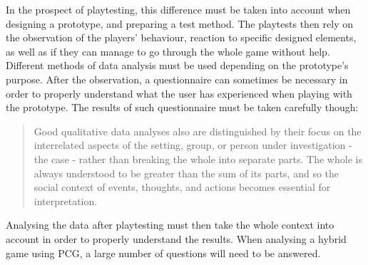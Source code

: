 In the prospect of playtesting, this difference must be taken into account when designing a prototype, and preparing a test method. The playtests then rely on the observation of the players' behaviour, reaction to specific designed elements, as well as if they can manage to go through the whole game without help. Different methods of data analysis must be used depending on the prototype's purpose. After the observation, a questionnaire can sometimes be necessary in order to properly understand what the user has experienced when playing with the prototype. The results of such questionnaire must be taken carefully though:
\begin{quotation}
Good qualitative data analyses also are distinguished by their focus on the interrelated aspects of the setting, group, or person under investigation - the case - rather than breaking the whole into separate parts. The whole is always understood to be greater than the sum of its parts, and so the social context of events, thoughts, and actions becomes
essential for interpretation. 
\end{quotation}
Analysing the data after playtesting must then take the whole context into account in order to properly understand the results. When analysing a hybrid game using PCG, a large number of questions will need to be answered.


